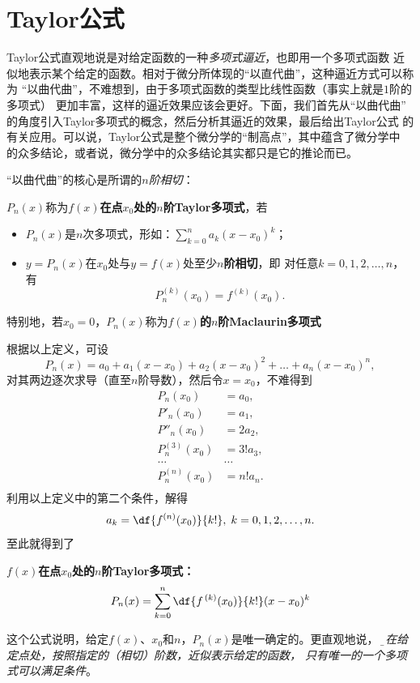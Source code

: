 \section{Taylor公式}

Taylor公式直观地说是对给定函数的一种{\it 多项式逼近}，也即用一个多项式函数
近似地表示某个给定的函数。相对于微分所体现的“以直代曲”，这种逼近方式可以称为
“以曲代曲”，不难想到，由于多项式函数的类型比线性函数（事实上就是$1$阶的多项式）
更加丰富，这样的逼近效果应该会更好。下面，我们首先从“以曲代曲”
的角度引入Taylor多项式的概念，然后分析其逼近的效果，最后给出Taylor公式
的有关应用。可以说，Taylor公式是整个微分学的“制高点”，其中蕴含了微分学中
的众多结论，或者说，微分学中的众多结论其实都只是它的推论而已。

“以曲代曲”的核心是所谓的{\it $n$阶相切}：

\begin{thx}
	$P_n(x)$称为{\bf $f(x)$在点$x_0$处的$n$阶Taylor多项式}，若
	\begin{itemize}
	  \item $P_n(x)$是$n$次多项式，形如：$\sum\limits_{k=0}^na_k(x-x_0)^k$；
	  \item $y=P_n(x)$在$x_0$处与$y=f(x)$处至少{\bf $n$阶相切}，即
	  对任意$k=0,1,2,\ldots,n$，有
	  $$P^{(k)}_n(x_0)=f^{(k)}(x_0).$$
	\end{itemize}
	特别地，若$x_0=0$，$P_n(x)$称为{\bf $f(x)$的$n$阶Maclaurin多项式}
\end{thx}

根据以上定义，可设
$$P_n(x)=a_0+a_1(x-x_0)+a_2(x-x_0)^2+\ldots+a_n(x-x_0)^n,$$
对其两边逐次求导（直至$n$阶导数），然后令$x=x_0$，不难得到
\begin{align*}
	P_n(x_0)&=a_0,\\
	P'_n(x_0)&=a_1,\\
	P''_n(x_0)&=2a_2,\\
	P^{(3)}_n(x_0)&=3!a_3,\\
	\ldots&\ldots\\
	P^{(n)}_n(x_0)&=n!a_n.\\
\end{align*}
利用以上定义中的第二个条件，解得
$$a_k=\df{f^{(n)}(x_0)}{k!},\;k=0,1,2,\ldots,n.$$
至此就得到了
\begin{thx}
	{\bf $f(x)$在点$x_0$处的$n$阶Taylor多项式：}
	$$P_n(x)=\sum\limits_{k=0}^n\df{f^{\,(k)}(x_0)}{k!}(x-x_0)^k$$
\end{thx}
这个公式说明，给定$f(x)$、$x_0$和$n$，$P_n(x)$是唯一确定的。更直观地说，
{\it\b 要在给定点处，按照指定的（相切）阶数，近似表示给定的函数，
只有唯一的一个多项式可以满足条件}。

